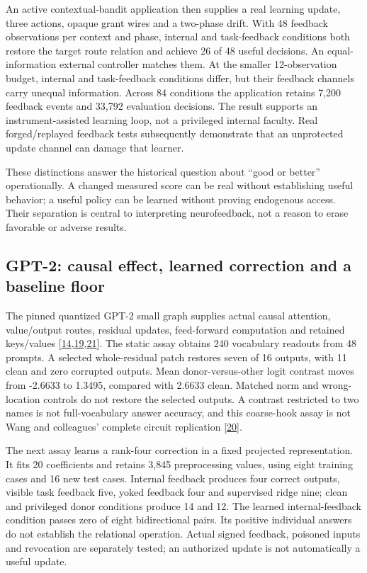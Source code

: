 \documentclass[11pt,letterpaper]{article}
\begin{document}
An active contextual-bandit application then supplies a real learning update, three actions, opaque grant wires and a two-phase drift. With 48 feedback observations per context and phase, internal and task-feedback conditions both restore the target route relation and achieve 26 of 48 useful decisions. An equal-information external controller matches them. At the smaller 12-observation budget, internal and task-feedback conditions differ, but their feedback channels carry unequal information. Across 84 conditions the application retains 7,200 feedback events and 33,792 evaluation decisions. The result supports an instrument-assisted learning loop, not a privileged internal faculty. Real forged/replayed feedback tests subsequently demonstrate that an unprotected update channel can damage that learner.

These distinctions answer the historical question about “good or better” operationally. A changed measured score can be real without establishing useful behavior; a useful policy can be learned without proving endogenous access. Their separation is central to interpreting neurofeedback, not a reason to erase favorable or adverse results.

\subsection{GPT-2: causal effect, learned correction and a baseline floor}

The pinned quantized GPT-2 small graph supplies actual causal attention, value/output routes, residual updates, feed-forward computation and retained keys/values [\hyperref[ref:14]{14},\hyperref[ref:19]{19},\hyperref[ref:21]{21}]. The static assay obtains 240 vocabulary readouts from 48 prompts. A selected whole-residual patch restores seven of 16 outputs, with 11 clean and zero corrupted outputs. Mean donor-versus-other logit contrast moves from -2.6633 to 1.3495, compared with 2.6633 clean. Matched norm and wrong-location controls do not restore the selected outputs. A contrast restricted to two names is not full-vocabulary answer accuracy, and this coarse-hook assay is not Wang and colleagues' complete circuit replication [\hyperref[ref:20]{20}].

The next assay learns a rank-four correction in a fixed projected representation. It fits 20 coefficients and retains 3,845 preprocessing values, using eight training cases and 16 new test cases. Internal feedback produces four correct outputs, visible task feedback five, yoked feedback four and supervised ridge nine; clean and privileged donor conditions produce 14 and 12. The learned internal-feedback condition passes zero of eight bidirectional pairs. Its positive individual answers do not establish the relational operation. Actual signed feedback, poisoned inputs and revocation are separately tested; an authorized update is not automatically a useful update.
\end{document}
